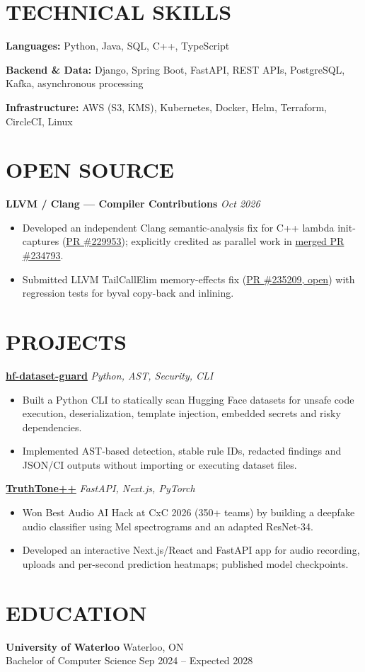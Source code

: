 \documentclass[11pt,letterpaper]{article}
\begin{document}
\section*{TECHNICAL SKILLS}
\noindent\textbf{Languages:} Python, Java, SQL, C++, TypeScript\par
\noindent\textbf{Backend \& Data:} Django, Spring Boot, FastAPI, REST APIs, PostgreSQL, Kafka, asynchronous processing\par
\noindent\textbf{Infrastructure:} AWS (S3, KMS), Kubernetes, Docker, Helm, Terraform, CircleCI, Linux\par
\section*{OPEN SOURCE}
\noindent\textbf{LLVM / Clang --- Compiler Contributions} \hfill \textit{Oct 2026}\par
\begin{itemize}
\item Developed an independent Clang semantic-analysis fix for C++ lambda init-captures (\href{https://github.com/llvm/llvm-project/pull/229953}{PR \#229953}); explicitly credited as parallel work in \href{https://github.com/llvm/llvm-project/pull/234793}{merged PR \#234793}.
\item Submitted LLVM TailCallElim memory-effects fix (\href{https://github.com/llvm/llvm-project/pull/235209}{PR \#235209, open}) with regression tests for byval copy-back and inlining.
\end{itemize}
\section*{PROJECTS}
\noindent\href{https://github.com/beanscrack/hf-dataset-guard}{\textbf{hf-dataset-guard}} \hfill \textit{Python, AST, Security, CLI}\par
\begin{itemize}
\item Built a Python CLI to statically scan Hugging Face datasets for unsafe code execution, deserialization, template injection, embedded secrets and risky dependencies.
\item Implemented AST-based detection, stable rule IDs, redacted findings and JSON/CI outputs without importing or executing dataset files.
\end{itemize}
\noindent\href{https://github.com/beanscrack/Truth-Tone}{\textbf{TruthTone++}} \hfill \textit{FastAPI, Next.js, PyTorch}\par
\begin{itemize}
\item Won Best Audio AI Hack at CxC 2026 (350+ teams) by building a deepfake audio classifier using Mel spectrograms and an adapted ResNet-34.
\item Developed an interactive Next.js/React and FastAPI app for audio recording, uploads and per-second prediction heatmaps; published model checkpoints.
\end{itemize}
\section*{EDUCATION}
\noindent\textbf{University of Waterloo} \hfill Waterloo, ON\\
Bachelor of Computer Science \hfill Sep 2024 -- Expected 2028\par
\end{document}
